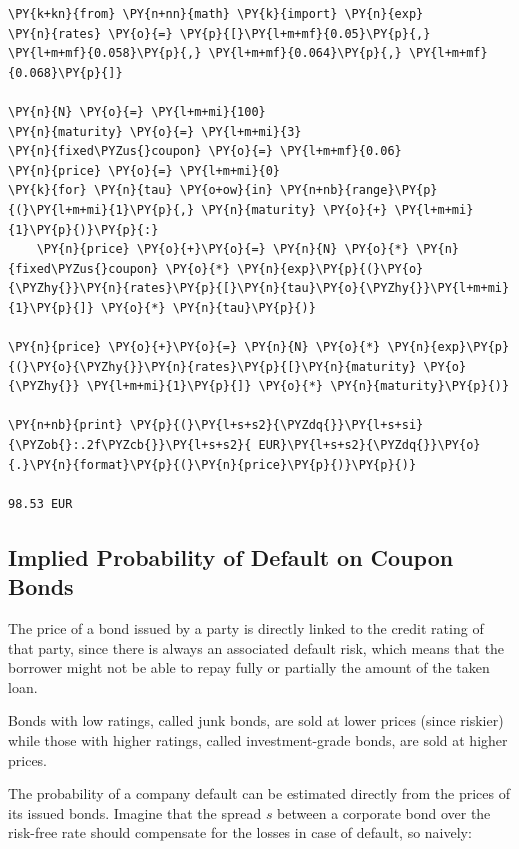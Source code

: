 \begin{tcolorbox}[breakable, size=fbox, boxrule=1pt, pad at break*=1mm,colback=cellbackground, colframe=cellborder]
\begin{Verbatim}[commandchars=\\\{\}]
\PY{k+kn}{from} \PY{n+nn}{math} \PY{k}{import} \PY{n}{exp}
\PY{n}{rates} \PY{o}{=} \PY{p}{[}\PY{l+m+mf}{0.05}\PY{p}{,} \PY{l+m+mf}{0.058}\PY{p}{,} \PY{l+m+mf}{0.064}\PY{p}{,} \PY{l+m+mf}{0.068}\PY{p}{]}

\PY{n}{N} \PY{o}{=} \PY{l+m+mi}{100}
\PY{n}{maturity} \PY{o}{=} \PY{l+m+mi}{3}
\PY{n}{fixed\PYZus{}coupon} \PY{o}{=} \PY{l+m+mf}{0.06}
\PY{n}{price} \PY{o}{=} \PY{l+m+mi}{0}
\PY{k}{for} \PY{n}{tau} \PY{o+ow}{in} \PY{n+nb}{range}\PY{p}{(}\PY{l+m+mi}{1}\PY{p}{,} \PY{n}{maturity} \PY{o}{+} \PY{l+m+mi}{1}\PY{p}{)}\PY{p}{:}
    \PY{n}{price} \PY{o}{+}\PY{o}{=} \PY{n}{N} \PY{o}{*} \PY{n}{fixed\PYZus{}coupon} \PY{o}{*} \PY{n}{exp}\PY{p}{(}\PY{o}{\PYZhy{}}\PY{n}{rates}\PY{p}{[}\PY{n}{tau}\PY{o}{\PYZhy{}}\PY{l+m+mi}{1}\PY{p}{]} \PY{o}{*} \PY{n}{tau}\PY{p}{)}

\PY{n}{price} \PY{o}{+}\PY{o}{=} \PY{n}{N} \PY{o}{*} \PY{n}{exp}\PY{p}{(}\PY{o}{\PYZhy{}}\PY{n}{rates}\PY{p}{[}\PY{n}{maturity} \PY{o}{\PYZhy{}} \PY{l+m+mi}{1}\PY{p}{]} \PY{o}{*} \PY{n}{maturity}\PY{p}{)}
    
\PY{n+nb}{print} \PY{p}{(}\PY{l+s+s2}{\PYZdq{}}\PY{l+s+si}{\PYZob{}:.2f\PYZcb{}}\PY{l+s+s2}{ EUR}\PY{l+s+s2}{\PYZdq{}}\PY{o}{.}\PY{n}{format}\PY{p}{(}\PY{n}{price}\PY{p}{)}\PY{p}{)}

98.53 EUR
\end{Verbatim}
\end{tcolorbox}

\subsection{Implied Probability of Default on Coupon Bonds}\label{default-probabilities-and-bond-prices}

The price of a bond issued by a party is directly linked to the credit
rating of that party, since there is always an associated default risk, which means that the borrower might not be able to repay
fully or partially the amount of the taken loan. 

Bonds with low ratings, called junk bonds, are sold at lower prices (since riskier) while those with higher ratings, called investment-grade bonds, are sold at higher prices.

The probability of a company default can be estimated directly from
the prices of its issued bonds. Imagine that the spread $s$
between a corporate bond over the risk-free rate should compensate for
the losses in case of default, so naively:

